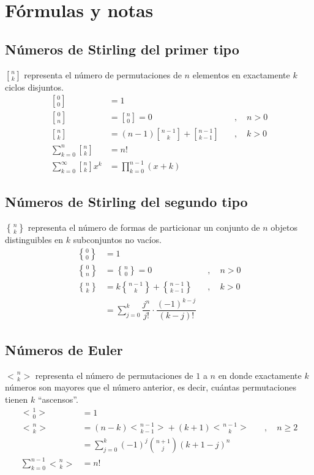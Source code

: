 \documentclass[11pt]{article}
\newcommand{\genstirlingI}[3]{%
	\genfrac{[}{]}{0pt}{#1}{#2}{#3}%
}
\newcommand{\genstirlingII}[3]{%
	\genfrac{\{}{\}}{0pt}{#1}{#2}{#3}%
}
\newcommand{\genEuler}[3]{%
	\genfrac{<}{>}{0pt}{#1}{#2}{#3}%
}
\newcommand{\stirlingI}[2]{\genstirlingI{}{#1}{#2}}
\newcommand{\stirlingII}[2]{\genstirlingII{}{#1}{#2}}
\newcommand{\euler}[2]{\genEuler{}{#1}{#2}}
\begin{document}
	\newpage
	\section{Fórmulas y notas}
		\subsection{Números de Stirling del primer tipo}
			$\stirlingI{n}{k}$ representa el número de permutaciones de $n$ elementos en exactamente $k$ ciclos disjuntos.
			\begin{align*}
				\stirlingI{0}{0} &= 1 \\
				\stirlingI{0}{n} &= \stirlingI{n}{0} = 0 \quad &, \quad n>0 \\
				\stirlingI{n}{k} &= (n-1)\stirlingI{n-1}{k} + \stirlingI{n-1}{k-1} \quad &, \quad k>0 \\
				\sum_{k=0}^{n} \stirlingI{n}{k} &= n! \\
				\sum_{k=0}^{\infty} \stirlingI{n}{k} x^k &= \prod_{k=0}^{n-1}(x+k)
			\end{align*}
		
		\subsection{Números de Stirling del segundo tipo}
			$\stirlingII{n}{k}$ representa el número de formas de particionar un conjunto de $n$ objetos distinguibles en $k$ subconjuntos no vacíos.
			\begin{align*}
				\stirlingII{0}{0} &= 1 \\
				\stirlingII{0}{n} &= \stirlingII{n}{0} = 0 \quad &, \quad n>0 \\
				\stirlingII{n}{k} &= k\stirlingII{n-1}{k} + \stirlingII{n-1}{k-1} \quad &, \quad k>0 \\
				&= \sum_{j=0}^{k} \dfrac{j^n}{j!} \cdot \dfrac{(-1)^{k-j}}{(k-j)!}
			\end{align*}
		
		\subsection{Números de Euler}
			$\euler{n}{k}$ representa el número de permutaciones de $1$ a $n$ en donde exactamente $k$ números son mayores que el número anterior, es decir, cuántas permutaciones tienen $k$ ``ascensos''.
			\begin{align*}
				\euler{1}{0} &= 1 \\
				\euler{n}{k} &= (n-k)\euler{n-1}{k-1} + (k+1)\euler{n-1}{k} \quad &, \quad n \geq 2 \\
				&= \sum_{j=0}^{k} (-1)^j \binom{n+1}{j} (k+1-j)^n \\
				\sum_{k=0}^{n-1} \euler{n}{k} &= n!
			\end{align*}
		
\end{document}
